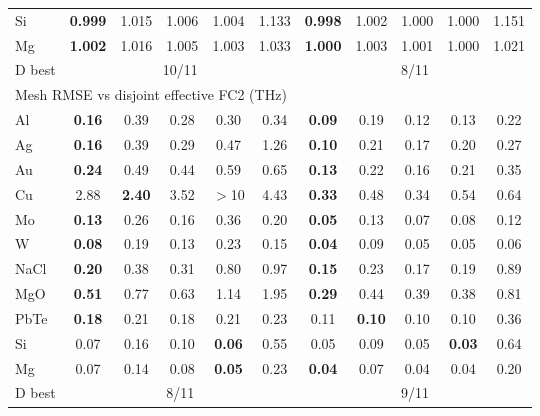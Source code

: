 \begin{table}[t]
\begin{ruledtabular}
\begin{tabular}{lcccccccccc}
Si & \textbf{0.999} & 1.015 & 1.006 & 1.004 & 1.133 & \textbf{0.998} & 1.002 & 1.000 & 1.000 & 1.151\\
Mg & \textbf{1.002} & 1.016 & 1.005 & 1.003 & 1.033 & \textbf{1.000} & 1.003 & 1.001 & 1.000 & 1.021\\
D best & \multicolumn{5}{c}{10/11} & \multicolumn{5}{c}{8/11}\\
\hline
\multicolumn{11}{l}{Mesh RMSE vs disjoint effective FC2 (THz)}\\
Al & \textbf{0.16} & 0.39 & 0.28 & 0.30 & 0.34 & \textbf{0.09} & 0.19 & 0.12 & 0.13 & 0.22\\
Ag & \textbf{0.16} & 0.39 & 0.29 & 0.47 & 1.26 & \textbf{0.10} & 0.21 & 0.17 & 0.20 & 0.27\\
Au & \textbf{0.24} & 0.49 & 0.44 & 0.59 & 0.65 & \textbf{0.13} & 0.22 & 0.16 & 0.21 & 0.35\\
Cu & 2.88 & \textbf{2.40} & 3.52 & $>$10 & 4.43 & \textbf{0.33} & 0.48 & 0.34 & 0.54 & 0.64\\
Mo & \textbf{0.13} & 0.26 & 0.16 & 0.36 & 0.20 & \textbf{0.05} & 0.13 & 0.07 & 0.08 & 0.12\\
W & \textbf{0.08} & 0.19 & 0.13 & 0.23 & 0.15 & \textbf{0.04} & 0.09 & 0.05 & 0.05 & 0.06\\
NaCl & \textbf{0.20} & 0.38 & 0.31 & 0.80 & 0.97 & \textbf{0.15} & 0.23 & 0.17 & 0.19 & 0.89\\
MgO & \textbf{0.51} & 0.77 & 0.63 & 1.14 & 1.95 & \textbf{0.29} & 0.44 & 0.39 & 0.38 & 0.81\\
PbTe & \textbf{0.18} & 0.21 & 0.18 & 0.21 & 0.23 & 0.11 & \textbf{0.10} & 0.10 & 0.10 & 0.36\\
Si & 0.07 & 0.16 & 0.10 & \textbf{0.06} & 0.55 & 0.05 & 0.09 & 0.05 & \textbf{0.03} & 0.64\\
Mg & 0.07 & 0.14 & 0.08 & \textbf{0.05} & 0.23 & \textbf{0.04} & 0.07 & 0.04 & 0.04 & 0.20\\
D best & \multicolumn{5}{c}{8/11} & \multicolumn{5}{c}{9/11}\\
\end{tabular}
\end{ruledtabular}
\end{table}
